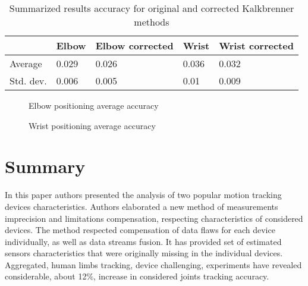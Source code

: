 \documentclass{llncs}
\begin{document}
\begin{table}[]
	\centering
		
	\caption{Summarized results accuracy for original and corrected Kalkbrenner methods}
	\label{tab:summary}
	\begin{tabular}{l|l|l|l|l|}
		\cline{2-5}
		                                & \multicolumn{1}{c|}{Elbow} & \multicolumn{1}{c|}{Elbow corrected} & \multicolumn{1}{c|}{Wrist} & \multicolumn{1}{c|}{Wrist corrected} \\ \hline
		\multicolumn{1}{|l|}{Average}   & 0.029                      & 0.026                                & 0.036                      & 0.032                                \\ \hline
		\multicolumn{1}{|l|}{Std. dev.} & 0.006                      & 0.005                                & 0.01                       & 0.009                                \\ \hline
	\end{tabular}
	
\end{table}

\begin{figure}[h!]
	\centering
	\begin{minipage}[b]{0.49\linewidth}
		\centering   
		\vspace{2.5cm}
		\caption{Elbow positioning average accuracy}
		\label{fig:positionElbow}
	\end{minipage}
	\begin{minipage}[b]{0.49\linewidth}
		\centering 
		\caption{Wrist positioning average accuracy}
		\label{fig:positionWrist}
	\end{minipage}
				
\end{figure}
\section{Summary}
In this paper authors presented the analysis of two popular motion tracking devices characteristics. Authors elaborated a new method of measurements imprecision and limitations compensation, respecting characteristics of considered devices. The method respected compensation of data flaws for each device individually, as well as data streams fusion. It has provided set of estimated sensors characteristics that were originally missing in the individual devices. Aggregated, human limbs tracking, device challenging, experiments have revealed considerable, about 12\%, increase in considered joints tracking accuracy.
\end{document}
